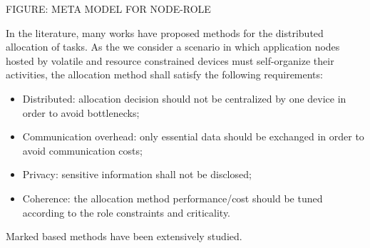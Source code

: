 FIGURE: META MODEL FOR NODE-ROLE

In the literature, many works have proposed methods for the distributed allocation of tasks. As the we consider a scenario in which application nodes hosted by volatile and resource constrained devices must self-organize their activities, the allocation method shall satisfy the following requirements:

\begin{itemize}
	
	\item Distributed: allocation decision should not be centralized by one device in order to avoid bottlenecks;
	
	\item Communication overhead: only essential data should be exchanged in order to avoid communication costs; 
	
	\item Privacy: sensitive information shall not be disclosed;
	
	\item Coherence: the allocation method performance/cost should be tuned according to the role constraints and criticality.
	  
\end{itemize} 

Marked based methods have been extensively studied.





